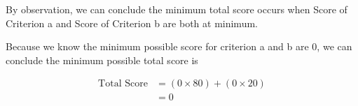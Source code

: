 \documentclass[12pt]{article}
\begin{document}
\begin{itemize}
    \bigskip

    By observation, we can conclude the minimum total score occurs when Score of Criterion a
    and Score of Criterion b are both at minimum.

    \bigskip

    Because we know the minimum possible score for criterion a and b are 0,
    we can conclude the minimum possible total score is

    \begin{align}
        \text{Total Score} &= (0 \times 80) + (0 \times 20)\\
        &= 0
    \end{align}

\end{itemize}

\bigskip
\end{document}
